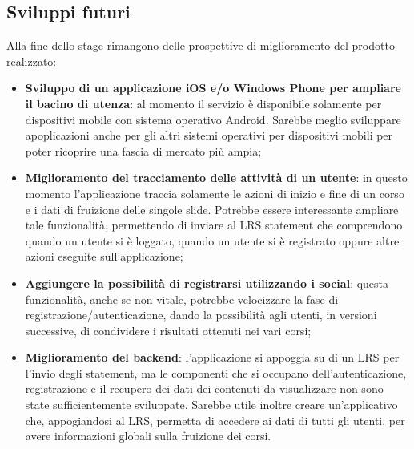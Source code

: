\documentclass[../Tesi.tex]{subfiles}
\begin{document}
	\subsection{Sviluppi futuri}
	Alla fine dello stage rimangono delle prospettive di miglioramento del prodotto realizzato:
	\begin{itemize}
		\item \textbf{Sviluppo di un applicazione iOS e/o Windows Phone per ampliare il bacino di utenza}: al momento il servizio è disponibile solamente per dispositivi mobile con sistema operativo Android. Sarebbe meglio sviluppare apoplicazioni anche per gli altri sistemi operativi per dispositivi mobili per poter ricoprire una fascia di mercato più ampia;
		\item \textbf{Miglioramento del tracciamento delle attività di un utente}: in questo momento l'applicazione traccia solamente le azioni di inizio e fine di un corso e i dati di fruizione delle singole slide. Potrebbe essere interessante ampliare tale funzionalità, permettendo di inviare al LRS statement che comprendono quando un utente si è loggato, quando un utente si è registrato oppure altre azioni eseguite sull'applicazione;
		\item \textbf{Aggiungere la possibilità di registrarsi utilizzando i social}: questa funzionalità, anche se non vitale, potrebbe velocizzare la fase di registrazione/autenticazione, dando la possibilità agli utenti, in versioni successive, di condividere i risultati ottenuti nei vari corsi;
		\item \textbf{Miglioramento del backend}: l'applicazione si appoggia su di un LRS per l'invio degli statement, ma le componenti che si occupano dell'autenticazione, registrazione e il recupero dei dati dei contenuti da visualizzare non sono state sufficientemente sviluppate. Sarebbe utile inoltre creare un'applicativo che, appogiandosi al LRS, permetta di accedere ai dati di tutti gli utenti, per avere informazioni globali sulla fruizione dei corsi.
	\end{itemize}
\end{document}

